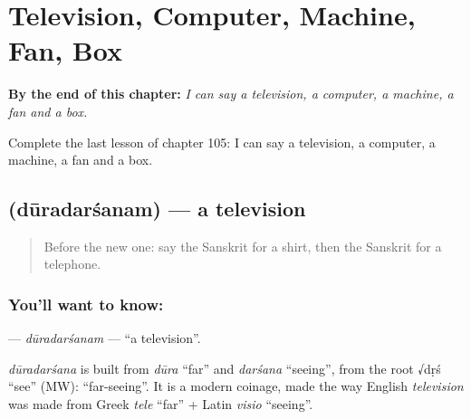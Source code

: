 
\chapter{Television, Computer, Machine, Fan, Box}
\label{ch:sa-television-computer-machine-fan-box}

\begin{chapteropening}
\textbf{By the end of this chapter:} \emph{I can say a television, a computer, a machine, a fan and a box.}

Complete the last lesson of chapter 105: I can say a television, a computer, a machine, a fan and a box.
\end{chapteropening}

\section[\texorpdfstring{\sk{दूरदर्शनम्} (dūradarśanam)}{दूरदर्शनम् (dūradarśanam)}]{ (dūradarśanam) — a television}

\label{lesson:SA-C105-duradarsanam}



\begin{quote}
Before the new one: say the Sanskrit for a shirt, then the Sanskrit for a telephone.
\end{quote}

\subsection*{You'll want to know: }
\textbf{} — \emph{dūradarśanam} — \textquotedblleft{}a television\textquotedblright{}.

\begin{cousinweb}
\emph{dūradarśana} is built from \emph{dūra} \textquotedblleft{}far\textquotedblright{} and \emph{darśana} \textquotedblleft{}seeing\textquotedblright{}, from the root √dṛś \textquotedblleft{}see\textquotedblright{} (MW): \textquotedblleft{}far-seeing\textquotedblright{}. It is a modern coinage, made the way English \emph{television} was made from Greek \emph{tele} \textquotedblleft{}far\textquotedblright{} + Latin \emph{visio} \textquotedblleft{}seeing\textquotedblright{}.
\end{cousinweb}

